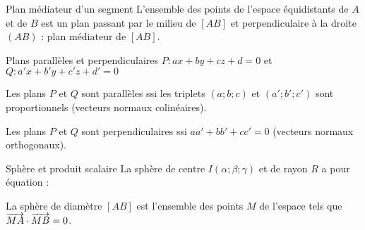 \medskip

\begin{bclogo}{Plan médiateur d'un segment}
L'ensemble des points de l'espace équidistants de $A$ et de $B$ est un plan passant par le milieu de $\left[ AB\right] $ et perpendiculaire à la droite $(AB)$ : plan médiateur de $\left[ AB\right] $.
\end{bclogo}

\newpage

\begin{bclogo}{Plans parallèles et perpendiculaires}
$P: ax+by+cz+d=0$ et $Q: a'x+b'y+c'z+d'=0$

Les plans $P$ et $Q$ sont parallèles ssi les triplets $(a;b;c)$ et $(a';b';c')$ sont proportionnels (vecteurs normaux colinéaires).

Les plans $P$ et $Q$ sont perpendiculaires ssi $aa'+bb'+cc'=0$ (vecteurs normaux orthogonaux).
\end{bclogo}

\medskip

\begin{bclogo}{Sphère et produit scalaire}
La sphère de centre $I(\alpha ; \beta ; \gamma)$ et de rayon $R$ a pour équation : 

La sphère de diamètre $\left[ AB\right] $ est l'ensemble des points $M$ de l'espace tels que $\overrightarrow{MA}\cdot \overrightarrow{MB}=0$.
\end{bclogo}




